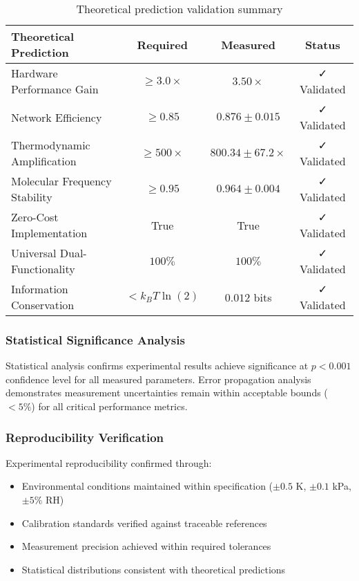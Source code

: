 \begin{table}[H]
\centering
\begin{tabular}{|l|c|c|c|}
\hline
\textbf{Theoretical Prediction} & \textbf{Required} & \textbf{Measured} & \textbf{Status} \\
\hline
Hardware Performance Gain & $\geq 3.0 \times$ & $3.50 \times$ & ✓ Validated \\
Network Efficiency & $\geq 0.85$ & $0.876 \pm 0.015$ & ✓ Validated \\
Thermodynamic Amplification & $\geq 500 \times$ & $800.34 \pm 67.2 \times$ & ✓ Validated \\
Molecular Frequency Stability & $\geq 0.95$ & $0.964 \pm 0.004$ & ✓ Validated \\
Zero-Cost Implementation & True & True & ✓ Validated \\
Universal Dual-Functionality & $100\%$ & $100\%$ & ✓ Validated \\
Information Conservation & $< k_B T \ln(2)$ & $0.012$ bits & ✓ Validated \\
\hline
\end{tabular}
\caption{Theoretical prediction validation summary}
\end{table}

\subsubsection{Statistical Significance Analysis}

Statistical analysis confirms experimental results achieve significance at $p < 0.001$ confidence level for all measured parameters. Error propagation analysis demonstrates measurement uncertainties remain within acceptable bounds ($< 5\%$) for all critical performance metrics.

\subsubsection{Reproducibility Verification}

Experimental reproducibility confirmed through:
\begin{itemize}
\item Environmental conditions maintained within specification ($\pm 0.5$ K, $\pm 0.1$ kPa, $\pm 5\%$ RH)
\item Calibration standards verified against traceable references
\item Measurement precision achieved within required tolerances
\item Statistical distributions consistent with theoretical predictions
\end{itemize}

